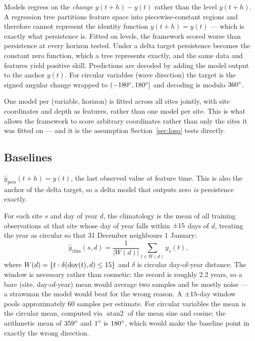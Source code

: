 Models regress on the \emph{change} $y(t+h) - y(t)$ rather than the level
$y(t+h)$. A regression tree partitions feature space into piecewise-constant
regions and therefore cannot represent the identity function
$y(t+h) = y(t)$ --- which is exactly what persistence is. Fitted on levels, the
framework scored worse than persistence at every horizon tested. Under a delta
target persistence becomes the constant zero function, which a tree represents
exactly, and the same data and features yield positive skill. Predictions are
decoded by adding the model output to the anchor $y(t)$. For circular
variables (wave direction) the target is the signed angular change wrapped to
$(-180^{\circ}, 180^{\circ}]$ and decoding is modulo $360^{\circ}$.

One model per (variable, horizon) is fitted across all \NSites{} sites jointly,
with site coordinates and depth as features, rather than one model per site.
This is what allows the framework to score arbitrary coordinates rather than
only the sites it was fitted on --- and it is the assumption
Section~\ref{sec:loso} tests directly.

\subsection{Baselines}

$\hat{y}_{\text{pers}}(t+h) = y(t)$, the last observed value at feature time.
This is also the anchor of the delta target, so a delta model that outputs
zero \emph{is} persistence exactly.

For each site $s$ and day of year $d$, the climatology is the mean of all
training observations at that site whose day of year falls within
$\pm15$ days of $d$, treating the year as circular so that 31
December neighbours 1 January:
%
\begin{equation}
\hat{y}_{\text{clim}}(s, d) = \frac{1}{|W(d)|}\sum_{t \in W(d)} y_s(t),
\end{equation}
%
where $W(d) = \{t : \delta(\mathrm{doy}(t), d) \leq 15\}$ and $\delta$
is circular day-of-year distance. The window is necessary
rather than cosmetic: the record is roughly 2.2 years, so a bare
(site, day-of-year) mean would average two samples and be mostly noise --- a
strawman the model would beat for the wrong reason. A $\pm15$-day
window pools approximately 60 samples per estimate. For circular variables the
mean is the circular mean, computed via $\operatorname{atan2}$ of the mean sine
and cosine; the arithmetic mean of $359^{\circ}$ and $1^{\circ}$ is $180^{\circ}$,
which would make the baseline point in exactly the wrong direction.

